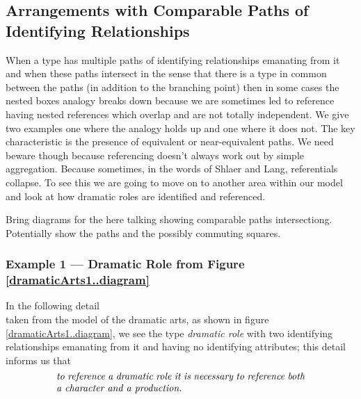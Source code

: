 \subsection{Arrangements with Comparable Paths of Identifying Relationships}
When a type has multiple paths of identifying relationships emanating from it and when these paths intersect in the sense that there is a type in common between the paths (in addition to the
branching point) then in some cases the nested boxes analogy breaks down
because we are sometimes led to reference having nested references which overlap and are not totally independent. We give two examples one where the analogy holds up and one where it does not. The key characteristic is the presence of equivalent or near-equivalent paths.
We need beware though because referencing doesn't always work out by simple aggregation. Because sometimes,
in the words of Shlaer and Lang, referentials collapse. 
To see this we are going to move on to another area within our model and look at how dramatic roles are identified and referenced.

\begin{worktt}
Bring diagrams for the here talking showing comparable paths intersectiong. 
Potentially show the paths and the possibly commuting squares.
\end{worktt}


 \subsubsection{Example 1 --- Dramatic Role from Figure \ref{dramaticArts1..diagram}}
\mynote
In the following detail
\begin{equation*}

\end{equation*}
taken from the model of the dramatic arts, as shown in figure \ref{dramaticArts1..diagram}, 
we see the type \textit{dramatic role} 
with  two identifying relationships emanating from it and having no identifying attributes;
this detail informs us that
\begin{equation}
\label{DramaticRoleReferencing}
\text{\parbox{9cm}{\textit{to reference a dramatic role it is necessary  
to reference both a character and  a production.}}}
\end{equation}

